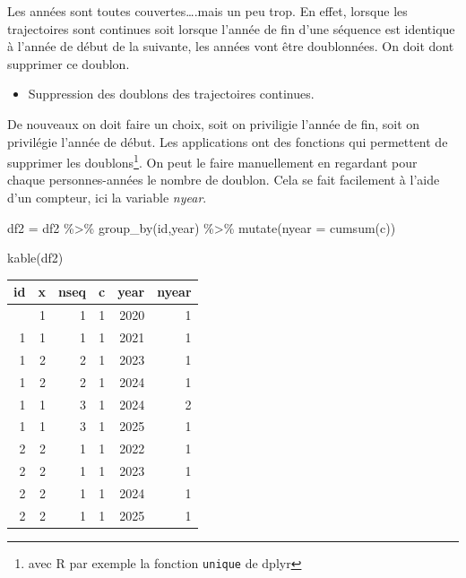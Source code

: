 \documentclass[
  12pt,
  letterpaper,
  DIV=11,
  numbers=noendperiod,
  onepage,
  openany]{scrreprt}
\newenvironment{Shaded}{\begin{snugshade}}{\end{snugshade}}
\newcommand{\AttributeTok}[1]{\textcolor[rgb]{0.80,0.80,0.80}{#1}}
\newcommand{\FunctionTok}[1]{\textcolor[rgb]{0.94,0.94,0.56}{#1}}
\newcommand{\NormalTok}[1]{\textcolor[rgb]{0.80,0.80,0.80}{#1}}
\newcommand{\OtherTok}[1]{\textcolor[rgb]{0.94,0.94,0.56}{#1}}
\newcommand{\SpecialCharTok}[1]{\textcolor[rgb]{0.86,0.64,0.64}{#1}}
\providecommand{\tightlist}{%
  \setlength{\itemsep}{0pt}\setlength{\parskip}{0pt}}\usepackage{longtable,booktabs,array}
\begin{document}
Les années sont toutes couvertes\ldots.mais un peu trop. En effet,
lorsque les trajectoires sont continues soit lorsque l'année de fin
d'une séquence est identique à l'année de début de la suivante, les
années vont être doublonnées. On doit dont supprimer ce doublon.

\begin{itemize}
\tightlist
\item
  Suppression des doublons des trajectoires continues.
\end{itemize}

De nouveaux on doit faire un choix, soit on priviligie l'année de fin,
soit on privilégie l'année de début. Les applications ont des fonctions
qui permettent de supprimer les doublons\footnote{avec R par exemple la
  fonction \texttt{unique} de dplyr}. On peut le faire manuellement en
regardant pour chaque personnes-années le nombre de doublon. Cela se
fait facilement à l'aide d'un compteur, ici la variable \emph{nyear}.

\begin{Shaded}
\begin{Highlighting}[]
\NormalTok{df2 }\OtherTok{=}\NormalTok{ df2 }\SpecialCharTok{\%\textgreater{}\%} \FunctionTok{group\_by}\NormalTok{(id,year) }\SpecialCharTok{\%\textgreater{}\%} \FunctionTok{mutate}\NormalTok{(}\AttributeTok{nyear =} \FunctionTok{cumsum}\NormalTok{(c))}

\FunctionTok{kable}\NormalTok{(df2)}
\end{Highlighting}
\end{Shaded}

\begin{longtable}[]{@{}rrrrrr@{}}
\toprule\noalign{}
id & x & nseq & c & year & nyear \\
\midrule\noalign{}
\endhead
\bottomrule\noalign{}
\endlastfoot
1 & 1 & 1 & 1 & 2020 & 1 \\
1 & 1 & 1 & 1 & 2021 & 1 \\
1 & 2 & 2 & 1 & 2023 & 1 \\
1 & 2 & 2 & 1 & 2024 & 1 \\
1 & 1 & 3 & 1 & 2024 & 2 \\
1 & 1 & 3 & 1 & 2025 & 1 \\
2 & 2 & 1 & 1 & 2022 & 1 \\
2 & 2 & 1 & 1 & 2023 & 1 \\
2 & 2 & 1 & 1 & 2024 & 1 \\
2 & 2 & 1 & 1 & 2025 & 1 \\
\end{longtable}
\end{document}

